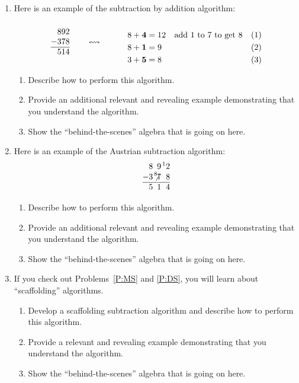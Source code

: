 \begin{problems}
\begin{enumerate}
\begin{enumerate}
\end{enumerate}
\item Here is an example of the subtraction by addition
  algorithm:
\[
\begin{array}[c]{@{}r@{}}
892\\
-378\\ \hline
514
\end{array} 
\qquad\leftrightsquigarrow\qquad
\begin{minipage}{40ex}
\begin{align*}
8 + \textbf{4} &= 12 & &\text{add $1$ to $7$ to get $8$} \\
8 + \textbf{1} &= 9 \\
3 + \textbf{5} &= 8
\end{align*}
\end{minipage}
\]
\begin{enumerate}
\item Describe how to perform this algorithm.
\item Provide an additional relevant and revealing example
  demonstrating that you understand the algorithm.
\item Show the ``behind-the-scenes'' algebra that is going on here.
\end{enumerate}


\item Here is an example of the Austrian subtraction
  algorithm:
\[
\begin{array}{@{}r@{}r@{}r@{}r@{}}
& 8 & 9 & \hspace{.3ex}\leftexp{1}2\\
- & 3 & \hspace{.3ex}\leftexp{8}{\hspace{-.8ex}\not{\hspace{0ex}7}} & 8\\ \hline
& 5 & 1 & 4
\end{array}
\]
\begin{enumerate}
\item Describe how to perform this algorithm.
\item Provide an additional relevant and revealing example
  demonstrating that you understand the algorithm.
\item Show the ``behind-the-scenes'' algebra that is going on here.
\end{enumerate}

\item If you check out Problems~\ref{P:MS} and \ref{P:DS}, you will
  learn about ``scaffolding'' algorithms.  
\begin{enumerate}
\item Develop a scaffolding subtraction algorithm and describe how to
  perform this algorithm.
\item Provide a relevant and revealing example demonstrating that you
  understand the algorithm.
\item Show the ``behind-the-scenes'' algebra that is going on here.
\end{enumerate}



\end{enumerate}
\end{problems}
